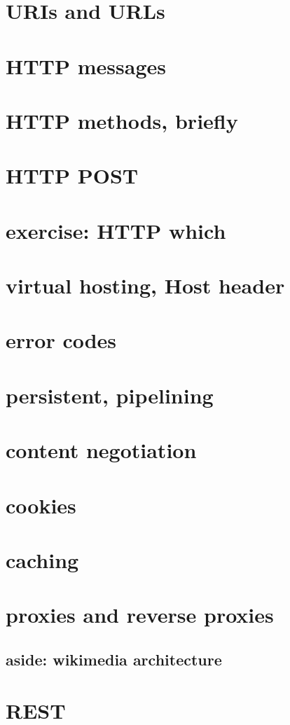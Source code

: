 \section{URIs and URLs}


\section{HTTP messages}


\section{HTTP methods, briefly}


\section{HTTP POST}


\section{exercise: HTTP which}


\section{virtual hosting, Host header}


\section{error codes}


\section{persistent, pipelining}


\section{content negotiation}


\section{cookies}


\section{caching}


\section{proxies and reverse proxies}


\subsection{aside: wikimedia architecture}


\section{REST}


